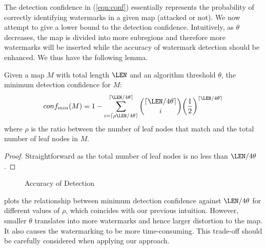 The detection confidence in (\ref{eqn:conf})
essentially represents the probability of correctly identifying watermarks 
in a given map (attacked or not). We now attempt to give a lower bound
to the detection confidence. 
Intuitively, as $\theta$ decreases, the map is divided into more
subregions and therefore more watermarks will be inserted while
the accuracy of watermark detection should be enhanced. We thus have
the following lemma.
\begin{lemma}
\label{lemma-accuracy}
Given a map $M$ with total length $\LEN$ and an algorithm threshold $\theta$, 
the minimum detection confidence for $M$: 
\[
\label{pe}
conf_{min}(M) = 1 - \sum _{ i={\lceil\rho\LEN/{4 \theta}\rceil} }^{ \lceil\LEN/{4 \theta}\rceil}
{{\lceil \LEN/{4 \theta}\rceil \choose i} {\left(\frac{1}{2}\right)}^{\lceil \LEN/{4 \theta}\rceil}} 
\]
where $\rho$ is the ratio between the number of leaf nodes that match and
the total number of leaf nodes in $M$. 
\end{lemma}
\begin{proof}
Straightforward as the total number of leaf nodes is no less than $\LEN/{4 \theta}$.
\end{proof}

\begin{figure}[h]
\centering
{}
\caption{Accuracy of Detection}
\label{fig:security}
\end{figure} 

 plots the relationship between minimum detection confidence 
against $\LEN/4\theta$ for different values of $\rho$, which coincides with our
previous intuition.
However, smaller $\theta$ translates into more watermarks and hence larger
distortion to the map. It also causes the watermarking to be more 
time-consuming. This trade-off should be carefully considered when applying our
approach.


